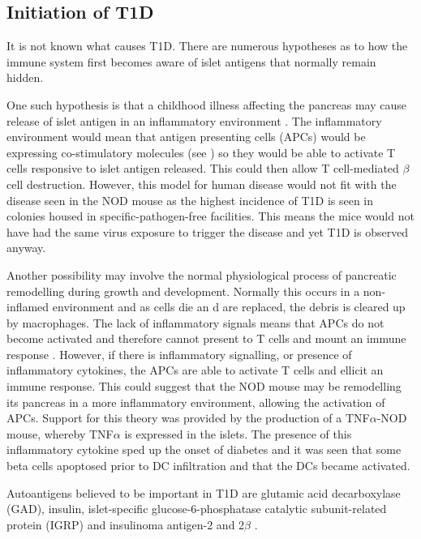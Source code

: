 \subsection{Initiation of T1D}

It is not known what causes T1D.
There are numerous hypotheses as to how the immune system first becomes aware of islet antigens that normally remain hidden.

One such hypothesis is that a childhood illness affecting the pancreas may cause release of islet antigen in an inflammatory environment \citep{Green1999, Andreoletti1997}.
The inflammatory environment would mean that antigen presenting cells (APCs) would be expressing co-stimulatory molecules (see ) so they would be able to activate T cells responsive to islet antigen released.
This could then allow T cell-mediated $\beta$ cell destruction.
However, this model for human disease would not fit with the disease seen in the NOD mouse as the highest incidence of T1D is seen in colonies housed in specific-pathogen-free facilities\citep{Delovitch1997}.
This means the mice would not have had the same virus exposure to trigger the disease and yet T1D is observed anyway.

Another possibility may involve the normal physiological process of pancreatic remodelling during growth and development.
Normally this occurs in a non-inflamed environment and as cells die an d are replaced, the debris is cleared up by macrophages.
The lack of inflammatory signals means that APCs do not become activated and therefore cannot present to T cells and mount an immune response \citep{Green1999}.
However, if there is inflammatory signalling, or presence of inflammatory cytokines, the APCs are able to activate T cells and ellicit an immune response.
This could suggest that the NOD mouse may be remodelling its pancreas in a more inflammatory environment, allowing the activation of APCs.
Support for this theory was provided by the production of a TNF$\alpha$-NOD mouse, whereby TNF$\alpha$ is expressed in the islets.
The presence of this inflammatory cytokine sped up the onset of diabetes and it was seen that some beta cells apoptosed prior to DC infiltration and that the DCs became activated\citep{Green1998}.

Autoantigens believed to be important in T1D are glutamic acid decarboxylase (GAD), insulin, islet-specific glucose-6-phosphatase catalytic subunit-related protein (IGRP) and insulinoma antigen-2 and 2$\beta$ \citep{Green1999, Roep2012}.


